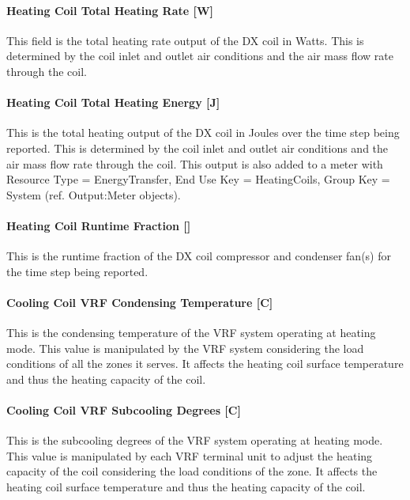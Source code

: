 \paragraph{Heating Coil Total Heating Rate {[}W{]}}\label{heating-coil-total-heating-rate-w-1}

This field is the total heating rate output of the DX coil in Watts. This is determined by the coil inlet and outlet air conditions and the air mass flow rate through the coil.

\paragraph{Heating Coil Total Heating Energy {[}J{]}}\label{heating-coil-total-heating-energy-j-1}

This is the total heating output of the DX coil in Joules over the time step being reported. This is determined by the coil inlet and outlet air conditions and the air mass flow rate through the coil. This output is also added to a meter with Resource Type = EnergyTransfer, End Use Key = HeatingCoils, Group Key = System (ref. Output:Meter objects).

\paragraph{Heating Coil Runtime Fraction {[]}}\label{heating-coil-runtime-fraction-2}

This is the runtime fraction of the DX coil compressor and condenser fan(s) for the time step being reported.

\paragraph{Cooling Coil VRF Condensing Temperature {[}C{]}}\label{cooling-coil-vrf-condensing-temperature-c}

This is the condensing temperature of the VRF system operating at heating mode. This value is manipulated by the VRF system considering the load conditions of all the zones it serves. It affects the heating coil surface temperature and thus the heating capacity of the coil.

\paragraph{Cooling Coil VRF Subcooling Degrees {[}C{]}}\label{cooling-coil-vrf-subcooling-degrees-c}

This is the subcooling degrees of the VRF system operating at heating mode. This value is manipulated by each VRF terminal unit to adjust the heating capacity of the coil considering the load conditions of the zone. It affects the heating coil surface temperature and thus the heating capacity of the coil.

